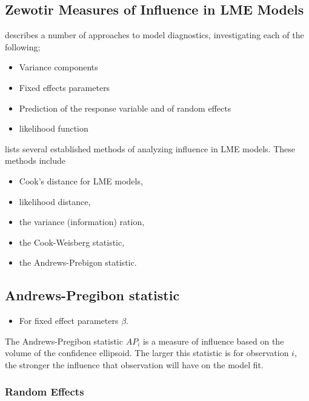 \documentclass[12pt, a4paper]{report}
\theoremstyle{plain}
\theoremstyle{definition}
\theoremstyle{remark}
\begin{document}
	\subsection{Zewotir Measures of Influence in LME Models}%
	\citet{Zewotir} describes a number of approaches to model diagnostics, investigating each of the following;
	\begin{itemize}
		\item Variance components
		\item Fixed effects parameters
		\item Prediction of the response variable and of random effects
		\item likelihood function
	\end{itemize}
	
	
	
	\citet{Zewotir} lists several established methods of analyzing influence in LME models. These methods include \begin{itemize}
		\item Cook's distance for LME models,
		\item {} likelihood distance,
		\item the variance (information) ration,
		\item the  Cook-Weisberg statistic,
		\item the  Andrews-Prebigon statistic.
	\end{itemize}
	
	
	
	\subsection{Andrews-Pregibon statistic} %
	\begin{itemize}
		\item For fixed effect parameters $\beta$.
	\end{itemize}
	The Andrews-Pregibon statistic $AP_{i}$ is a measure of influence based on the volume of the confidence ellipsoid.
	The larger this statistic is for observation $i$, the stronger the influence that observation will have on the model fit.
	
	
	
	
	\subsubsection{Random Effects}
	
\end{document}
